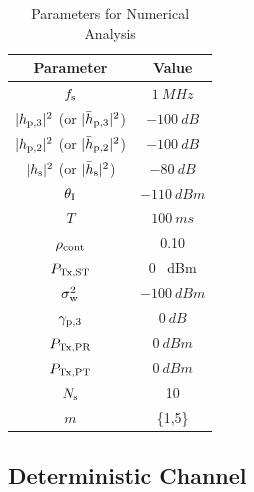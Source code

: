 
\begin{table}
\renewcommand{\arraystretch}{1.4}
\caption{Parameters for Numerical Analysis}
\label{tb_US:tb2}
\centering
\begin{tabular}{c||c}
\hline
\bfseries Parameter & \bfseries Value \\
\hline\hline
$f_{\text{s}}$  & $\SI{1}{MHz}$ \\ 
$|h_{\text{p,3}}|^2$ (or $|\bar{h}_{\text{p,3}}|^2$) & $\SI{-100}{dB}$ \\ 
$|h_{\text{p,2}}|^2$ (or $|\bar{h}_{\text{p,2}}|^2$) & $\SI{-100}{dB}$ \\ 
$|h_{\text{s}}|^2$ (or $|\bar{h}_{\text{s}}|^2$) & $\SI{-80}{dB}$ \\ 
$\theta_{\text{I}}$ & $\SI{-110}{dBm}$ \\ 
$T$ & $\SI{100}{ms}$ \\ 
$\rho_{\text{cont}}$ & 0.10 \\ 
$P_{\text{Tx,ST}}$ & 0 \SI{}{dBm} \\ 
$\sigma^2_{\text{w}}$ & $\SI{-100}{dBm}$ \\ 
${\gamma}_{\text{p,3}}$ & $\SI{0}{dB}$ \\ 
$P_{\text{Tx,PR}}$ & $\SI{0}{dBm}$ \\ 
$P_{\text{Tx,PT}}$ & $\SI{0}{dBm}$ \\ 
$N_{\text{s}}$ & 10 \\ 
$m$ & \{1,5\} \\ \hline
\end{tabular}%
\end{table}

\subsection{Deterministic Channel} 

